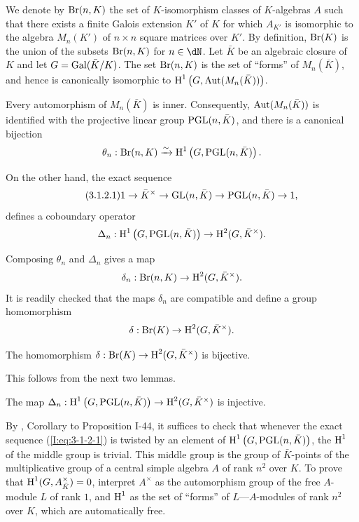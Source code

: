 We denote by $\operatorname{Br}(n,K)$ the set of $K$-isomorphism classes of
$K$-algebras $A$ such that there exists a finite Galois extension $K'$
of $K$ for which $A_{K'}$ is isomorphic to the algebra $M_n(K')$ of
$n\times n$ square matrices over $K'$. By definition, $\operatorname{Br}(K)$ is the
union of the subsets $\operatorname{Br}(n,K)$ for $n\in\dN$. Let $\bar K$ be an
algebraic closure of $K$ and let $G=\operatorname{Gal}(\bar K/K)$. The set $\operatorname{Br}(n,K)$
is the set of “forms” of $M_n(\bar K)$, and hence is canonically
isomorphic to $\operatorname{H}^1\left(G,\operatorname{Aut}(M_n(\bar K))\right)$.

Every automorphism of $M_n(\bar K)$ is inner. Consequently,
$\operatorname{Aut}(M_n(\bar K))$ is identified with the projective linear group
$\operatorname{PGL}(n,\bar K)$, and there is a canonical bijection
\[
  \theta_n : \operatorname{Br}(n,K) \xrightarrow\sim \operatorname{H}^1\left(G,\operatorname{PGL}(n,\bar K)\right)\text{.}
\]

On the other hand, the exact sequence
\begin{equation*}\tag{3.1.2.1}\label{I:eq:3-1-2-1}
  1 \to \bar K^\times \to \operatorname{GL}(n,\bar K) \to \operatorname{PGL}(n,\bar K) \to 1\text{,}
\end{equation*}
defines a coboundary operator
\[
  \Delta_n : \operatorname{H}^1\left(G,\operatorname{PGL}(n,\bar K)\right) \to \operatorname{H}^2(G,\bar K^\times)\text{.}
\]

Composing $\theta_n$ and $\Delta_n$ gives a map
\[
  \delta_n : \operatorname{Br}(n,K) \to \operatorname{H}^2(G,\bar K^\times)\text{.}
\]
It is readily checked that the maps $\delta_n$ are compatible and define
a group homomorphism
\[
  \delta : \operatorname{Br}(K) \to \operatorname{H}^2(G,\bar K^\times)\text{.}
\]

\begin{proposition}\label{I:3-1-3}
The homomorphism $\delta:\operatorname{Br}(K)\to\operatorname{H}^2(G,\bar K^\times)$ is bijective.
\end{proposition}

This follows from the next two lemmas.

\begin{lemma}\label{I:3-1-4}
The map
$\Delta_n:\operatorname{H}^1\left(G,\operatorname{PGL}(n,\bar K)\right)\to
\operatorname{H}^2(G,\bar K^\times)$ is injective.
\end{lemma}

By \cite{se94}, Corollary to Proposition I-44, it suffices to check that
whenever the exact sequence (\ref{I:eq:3-1-2-1}) is twisted by an element
of $\operatorname{H}^1\left(G,\operatorname{PGL}(n,\bar K)\right)$, the $\operatorname{H}^1$ of the middle group
is trivial. This middle group is the group of $\bar K$-points of the
multiplicative group of a central simple algebra $A$ of rank $n^2$ over
$K$. To prove that $\operatorname{H}^1(G,A_{\bar K}^\times)=0$, interpret $A^\times$
as the automorphism group of the free $A$-module $L$ of rank $1$, and
$\operatorname{H}^1$ as the set of “forms” of $L$---$A$-modules of rank $n^2$ over
$K$, which are automatically free.

